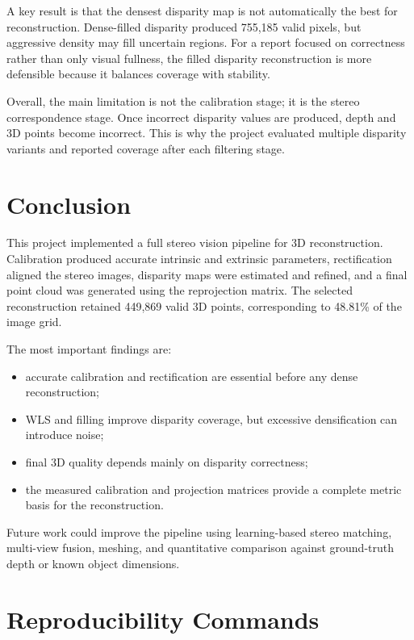 \documentclass[11pt,a4paper]{article}
\begin{document}
A key result is that the densest disparity map is not automatically the best for reconstruction. Dense-filled disparity produced 755,185 valid pixels, but aggressive density may fill uncertain regions. For a report focused on correctness rather than only visual fullness, the filled disparity reconstruction is more defensible because it balances coverage with stability.

Overall, the main limitation is not the calibration stage; it is the stereo correspondence stage. Once incorrect disparity values are produced, depth and 3D points become incorrect. This is why the project evaluated multiple disparity variants and reported coverage after each filtering stage.

\section{Conclusion}

This project implemented a full stereo vision pipeline for 3D reconstruction. Calibration produced accurate intrinsic and extrinsic parameters, rectification aligned the stereo images, disparity maps were estimated and refined, and a final point cloud was generated using the reprojection matrix. The selected reconstruction retained 449,869 valid 3D points, corresponding to 48.81\% of the image grid.

The most important findings are:
\begin{itemize}
    \item accurate calibration and rectification are essential before any dense reconstruction;
    \item WLS and filling improve disparity coverage, but excessive densification can introduce noise;
    \item final 3D quality depends mainly on disparity correctness;
    \item the measured calibration and projection matrices provide a complete metric basis for the reconstruction.
\end{itemize}

Future work could improve the pipeline using learning-based stereo matching, multi-view fusion, meshing, and quantitative comparison against ground-truth depth or known object dimensions.

\section*{Reproducibility Commands}
\end{document}
